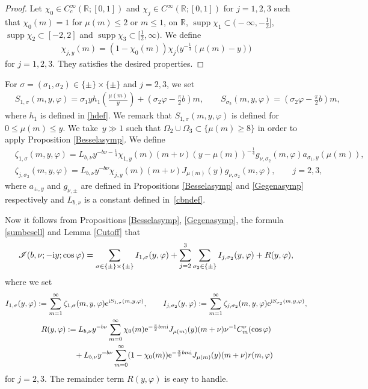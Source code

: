 \documentclass[pdftex]{sigma}
\numberwithin{equation}{section}
\def\R{\mathbb{R}}%
\DeclareMathOperator{\supp}{supp}%
\def\f{\varphi}
\def\m{\mu}
\def\n{\nu}
\def\s{\sigma}
\def\z{\zeta}
\newcommand{\sI}{\mathscr{I}}
\begin{document}
\begin{proof}
Let $\chi_0\in C_c^{\infty}(\R;[0,1])$ and $\chi_j\in C^{\infty}(\R;[0,1])$ for $j=1,2,3$ such that $\chi_0(m)=1$ for $\m(m)\leq 2$ or $m\leq 1$,  on $\R$, $\supp \chi_1\subset \bigl(-\infty,-\frac{1}{2}\bigr]$, $\supp \chi_2\subset [-2,2]$ and $\supp \chi_3\subset \bigl[\frac{1}{2},\infty\bigr)$. We define
\begin{align*}
\chi_{j,y}(m)=(1-\chi_0(m))\chi_j\bigl(y^{-\frac{1}{3}}(\m(m)-y)\bigr)
\end{align*}
for $j=1,2,3$.
They satisfies the desired properties.
\end{proof}

For $\s=(\s_1,\s_2)\in \{\pm\}\times \{\pm\}$ and $j=2,3$, we set
\begin{align*}
&S_{1,\s}(m,y,\f)=\s_1yh_1\left(\frac{\m(m)}{y}\right) +\left(\s_2\f-\frac{\pi}{2}b\right)m,\qquad S_{\s_2}(m,y,\f)=\left(\s_2\f-\frac{\pi}{2}b\right)m,
\end{align*}
where $h_1$ is defined in \eqref{hdef}. We remark that $S_{1,\sigma}(m,y,\f)$ is defined for $0\le \m(m)\le y$.
We take~${y\gg 1}$ such that $\Omega_2\cup \Omega_3\subset \{\m(m)\geq 8\}$ in order to apply Proposition \ref{Besselasymp}.
We define
\begin{align*}
&\z_{1,\s}(m,y,\f)=L_{b,\n}y^{-b\n-\frac{1}{4}}\chi_{1,y}(m)(m+\n)(y-\m(m))^{-\frac{1}{4}}g_{\n,\s_2}(m,\f)a_{\s_1,y}(\m(m)),\\
&\z_{j,\s_2}(m,y,\f)=L_{b,\n}y^{-b\n}\chi_{j,y}(m)(m+\n)J_{\m(m)}(y)g_{\n,\s_2}(m,\f),\qquad j=2,3,
\end{align*}
where $a_{\pm,y}$ and $g_{\n,\pm}$ are defined in Propositions \ref{Besselasymp} and \ref{Gegenasymp} respectively and $L_{b,\n}$ is a constant defined in~\eqref{cbndef}.

Now it follows from Propositions \ref{Besselasymp}, \ref{Gegenasymp}, the formula \eqref{sumbesell} and Lemma \ref{Cutoff} that
\begin{align}\label{sIdecom}
\sI(b,\nu;- {\rm i}y;\cos\f)=\sum_{\s\in \{\pm\}\times \{\pm\}}I_{1,\s}(y,\f)+\sum_{j=2}^3\sum_{\s_2\in \{\pm\}}I_{j,\s_2}(y,\f)+R(y,\f),
\end{align}
where we set
\begin{gather*}
I_{1,\s}(y,\f):=\sum_{m=1}^{\infty}\z_{1,\s}(m,y,\f){\rm e}^{{\rm i}S_{1,\s}(m,y,\f)},\qquad I_{j,\s_2}(y,\f):=\sum_{m=1}^{\infty}\z_{j,\s_2}(m,y,\f){\rm e}^{{\rm i}S_{\s_2}(m,y,\f)},\\
R(y,\f):=L_{b,\n}y^{-b\n}\sum_{m=0}^{\infty}\chi_0(m){\rm e}^{-\frac{\pi}{2}bm{\rm i}}J_{\m(m)}(y)(m+\nu)\n^{-1}C^{\nu}_m(\cos\f)\\
\phantom{R(y,\f):=}{}+L_{b,\n}y^{-b\n}\sum_{m=0}^{\infty}
(1-\chi_0(m))
{\rm e}^{-\frac{\pi}{2}bm{\rm i}}J_{\m(m)}(y)(m+\nu)r(m,\f)
\end{gather*}
for $j=2,3$.
The remainder term $R(y,\f)$ is easy to handle.
\end{document}
